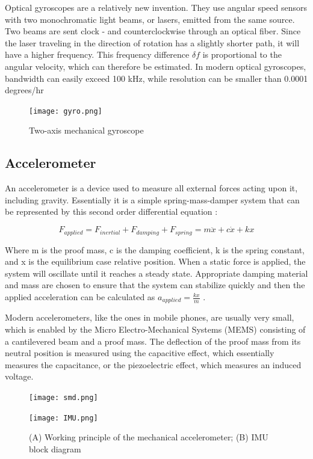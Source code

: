 \begin{itemize}
Optical gyroscopes are a relatively new invention. They use angular speed sensors with two monochromatic light beams, or lasers, emitted from the same source. Two beams are sent clock - and counterclockwise through an optical fiber. Since the laser traveling in the direction of rotation has a slightly shorter path, it will have a higher frequency. This frequency difference $\delta f$ is proportional to the angular velocity, which can therefore be estimated. In modern optical gyroscopes, bandwidth can easily exceed 100 kHz, while resolution can be smaller than 0.0001 degrees/hr



\begin{figure}[H]
\centering
        \texttt{[image: gyro.png]}
        \caption{Two-axis mechanical gyroscope \cite{SNS}}
        \label{fig:gyro}
\end{figure}





\subsection{Accelerometer}
An accelerometer is a device used to measure all external forces acting upon it, including gravity. Essentially it is a simple spring-mass-damper system that can be represented by this second order differential equation \cite{dudek2008inertial}:

$$F_{applied} = F_{inertial} + F_{damping} + F_{spring} = m \ddot{x} + c \dot{x} + k x$$

Where m is the proof mass, c is the damping coefficient, k is the spring constant, and x is the equilibrium case relative position. When a static force is applied, the system will oscillate until it reaches a steady state. Appropriate damping material and mass are chosen to ensure that the system can stabilize quickly and then the applied acceleration can be calculated as $a_{applied} = \frac{kx}{m}$ .

Modern accelerometers, like the ones in mobile phones, are usually very small, which is enabled by the Micro Electro-Mechanical Systems (MEMS) consisting of a cantilevered beam and a proof mass. The deflection of the proof mass from its neutral position is measured using the capacitive effect, which essentially measures the capacitance, or the piezoelectric effect, which measures an induced voltage.

\begin{figure}[H]
  \centering
  \begin{minipage}[b]{0.15\textwidth}
    \texttt{[image: smd.png]}
    \label{(a)}
  \end{minipage}
  \hfill
  \begin{minipage}[b]{0.7\textwidth}
    \texttt{[image: IMU.png]}
    \label{(b)}
  \end{minipage}
\caption{(A) Working principle of the mechanical accelerometer; (B) IMU block diagram \cite{dudek2008inertial}}
\end{figure}


\end{itemize}
